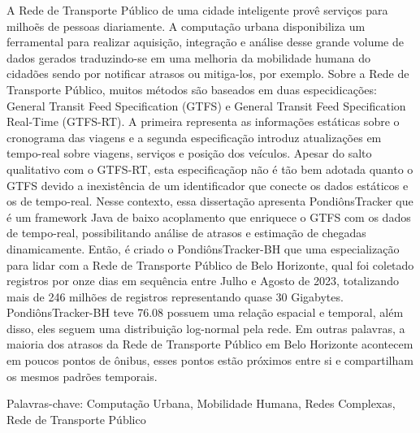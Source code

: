 \begin{resumo}
\vspace{-1cm}

\onehalfspacing

\noindent 
A Rede de Transporte Público de uma cidade inteligente provê serviços para milhoẽs de pessoas diariamente. A computação urbana disponibiliza um ferramental para realizar aquisição, integração e análise desse grande volume de dados gerados traduzindo-se em uma melhoria da mobilidade humana do cidadões sendo por notificar atrasos ou mitiga-los, por exemplo. Sobre a Rede de Transporte Público, muitos métodos são baseados em duas especidicações: General Transit Feed Specification (GTFS) e General Transit Feed Specification Real-Time (GTFS-RT). A primeira representa as informações estáticas sobre o cronograma das viagens e a segunda especificação introduz atualizações em tempo-real sobre viagens, serviços e posição dos veículos. Apesar do salto qualitativo com o GTFS-RT, esta especificaçãop não é tão bem adotada quanto o GTFS devido a inexistência de um identificador que conecte os dados estáticos e os de tempo-real. Nesse contexto, essa dissertação apresenta PondiônsTracker que é um framework Java de baixo acoplamento que enriquece o GTFS com os dados de tempo-real, possibilitando análise de atrasos e estimação de chegadas dinamicamente. Então, é criado o PondiônsTracker-BH que uma especialização para lidar com a Rede de Transporte Público de Belo Horizonte, qual foi coletado registros por onze dias em sequência entre Julho e Agosto de 2023, totalizando mais de 246 milhões de registros representando quase 30 Gigabytes. PondiônsTracker-BH teve 76.08%
possuem uma relação espacial e temporal, além disso, eles seguem uma distribuição log-normal pela rede. Em outras palavras, a maioria dos atrasos da Rede de Transporte Público em Belo Horizonte acontecem em poucos pontos de ônibus, esses pontos estão próximos entre si e compartilham os mesmos padrões temporais.

\vspace*{.75cm}

\noindent Palavras-chave: Computação Urbana, Mobilidade Humana, Redes Complexas, Rede de Transporte Público

\end{resumo}
